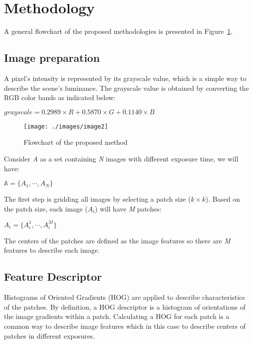 \documentclass[preprint,12pt,3p]{elsarticle}
\begin{document}
\section{Methodology}
\label{sec3}

A general flowchart of the proposed methodologies is presented in Figure~\ref{fig:flowchart}. 
\subsection{Image preparation}

A pixel's intensity is represented by its grayscale value, which is a simple way to describe the scene's luminance. The grayscale value is obtained by converting the RGB color bands as indicated below:

\begin{center}
$ grayscale = 0.2989 \times R + 0.5870 \times G + 0.1140 \times B $
\end{center}

\begin{figure}[t]
\centering
\texttt{[image: ./images/image2]}
\caption{Flowchart of the proposed method}
\label{fig:flowchart}
\end{figure}

Consider \textit{A} as a set containing \textit{N} images with different exposure time, we will have:
\begin{center}
$\mathbb{A} = \{A_{1}, \cdots , A_{N}\}$ \\ %
\end{center}
The first step is gridding all images by selecting a patch size ($k\times k$). Based on the patch size, each image ($A_i$) will have \textit{M} patches:

\begin{center}
$ A_{i}=\{A_{i}^{1}, \cdots, A_{i}^{M}\}$\\
\end{center}

The centers of the patches are defined as the image features so there are \textit{M} features to describe each image.\\ 

\subsection{Feature Descriptor}
Histograms of Oriented Gradients (HOG) are applied to describe characteristics of the patches. By definition, a HOG descriptor is a histogram of orientations of the image gradients within a patch\cite{15}. Calculating a HOG for each patch is a common way to describe image features which in this case to describe centers of patches in different exposures.
\end{document}
